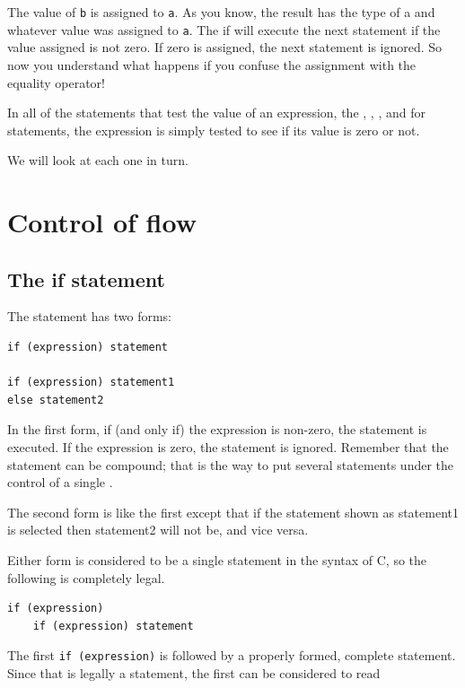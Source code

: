    The value of \texttt{b} is assigned to \texttt{a}. As you know,
    the result has the type of a and whatever value was assigned to
    \texttt{a}. The if will execute the next statement if the value
    assigned is not zero. If zero is assigned, the next statement is ignored.
    So now you understand what happens if you confuse the assignment with the
    equality operator!


   In all of the statements that test the value of an expression, the
    \kif, \while, \kdo, and for statements,
    the expression is simply tested to see if its value is zero or not.


   We will look at each one in turn.


  

 
        \section{Control of flow}
        

  

  \subsection{The if statement}
   

   The \kif{} statement has two forms:


   \begin{Verbatim}
if (expression) statement

if (expression) statement1
else statement2
\end{Verbatim}

   In the first form, if (and only if) the expression is
    non-zero, the statement is executed. If the
    expression is zero, the statement is ignored.
    Remember that the statement can be compound; that is the way to
    put several statements under the control of a single \kif.


   The second form is like the first except that if the statement shown as
    statement1 is selected then statement2 will not be,
    and vice versa.


   Either form is considered to be a single statement in the syntax
    of C, so the following is completely legal.


   \begin{Verbatim}
if (expression)
    if (expression) statement
\end{Verbatim}

   The first \texttt{if (expression)} is followed by a
    properly formed, complete \kif{} statement. Since that is legally
    a statement, the first \kif{} can be considered to read


